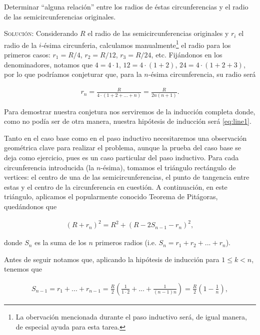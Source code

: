 \documentclass{article}
\begin{document}
\noindent Determinar ``alguna relación'' entre los radios de éstas circunferencias y el radio de las semicircunferencias originales.

\vspace{.5cm}

\noindent\textsc{Solución:} Considerando $R$ el radio de las semicircunferencias originales y $r_i$ el radio de la $i$-ésima circunferia, calculamos manualmente\footnote{La obervación mencionada durante el paso inductivo será, de igual manera, de especial ayuda para esta tarea.} el radio para los primeros casos: $r_1 = R/4$, $r_2 = R/12$, $r_3 = R/24$, etc. Fijándonos en los denominadores, notamos que $4 = 4 \cdot 1$, $12 = 4 \cdot (1 + 2)$, $24 = 4 \cdot (1 + 2 + 3)$, por lo que podríamos conjeturar que, para la $n$-ésima circunferencia, su radio será

\begin{align}
    r_n = \frac{R}{4 \cdot (1 + 2 + ... + n)} = \frac{R}{2n(n + 1)}. \label{eq:line1}
\end{align}

\noindent Para demostrar nuestra conjetura nos serviremos de la inducción completa donde, como no podía ser de otra manera, nuestra hipótesis de inducción será \eqref{eq:line1}.

Tanto en el caso base como en el paso inductivo necesitaremos una observación geométrica clave para realizar el problema, aunque la prueba del caso base se deja como ejercicio, pues es un caso particular del paso inductivo. Para cada circunferencia introducida (la $n$-ésima), tomamos el triángulo rectángulo de vertices: el centro de una de las semicircunferencias, el punto de tangencia entre estas y el centro de la circunferencia en cuestión. A continuación, en este triángulo, aplicamos el popularmente conocido Teorema de Pitágoras, quedándonos que

\begin{align}
    (R + r_n)^2 = R^2 + (R - 2S_{n-1} - r_n)^2 \label{eq:line2},
\end{align}

\noindent donde $S_n$ es la suma de los $n$ primeros radios (i.e. $S_n = r_1 + r_2 + ... + r_n$).

Antes de seguir notamos que, aplicando la hipótesis de inducción para $1 \leq k < n$, tenemos que

\begin{align}
    S_{n-1} = r_1 + ... + r_{n-1} = \frac{R}{2}\left(\frac{1}{1 \cdot 2} + ... + \frac{1}{(n - 1)n}\right) = \frac{R}{2}\left(1 - \frac{1}{n}\right), \label{eq:line3}
\end{align}
\end{document}
